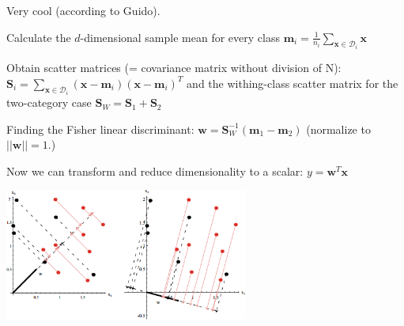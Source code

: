   \begin{minipage}{10.5cm}
  Very cool (according to Guido).
    \begin{aufzaehlung}
      \item Calculate the $d$-dimensional sample mean for every class
        $\bm{m}_i = \frac{1}{n_i} \sum\limits_{\bm{x} \in \mathcal{D}_i} \bm{x}$
      \item Obtain scatter matrices (= covariance matrix without division of N):
        $\bm{S}_i = \sum\limits_{\bm{x} \in \mathcal{D}_i} 
        (\bm{x}-\bm{m}_i) (\bm{x}-\bm{m}_i)^T$
        and the withing-class scatter matrix for the two-category case
        $\bm{S}_W = \bm{S}_1 + \bm{S}_2$
      \item Finding the Fisher linear discriminant:
        $\bm{w} = \bm{S}_W^{-1} (\bm{m}_1 - \bm{m}_2)$
        (normalize to$||\bm{w}||=1$.)
      \item Now we can transform and reduce dimensionality to a scalar:
        $y = \bm{w}^T \bm{x}$
    \end{aufzaehlung}
  \end{minipage}\hspace{5mm}
  \begin{minipage}{8cm}
    \includegraphics[width=8cm]{./images/fisher_discriminant.png}
  \end{minipage}
  
